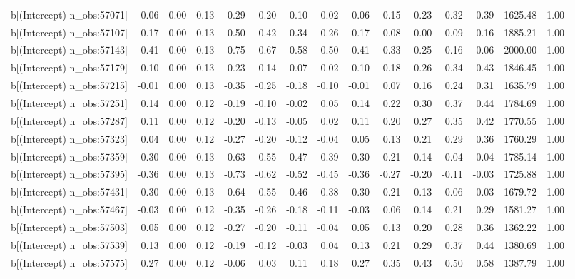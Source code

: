 \begin{table}[ht]
\begin{tabular}{rrrrrrrrrrrrrrr}
  b[(Intercept) n\_obs:57071] & 0.06 & 0.00 & 0.13 & -0.29 & -0.20 & -0.10 & -0.02 & 0.06 & 0.15 & 0.23 & 0.32 & 0.39 & 1625.48 & 1.00 \\ 
  b[(Intercept) n\_obs:57107] & -0.17 & 0.00 & 0.13 & -0.50 & -0.42 & -0.34 & -0.26 & -0.17 & -0.08 & -0.00 & 0.09 & 0.16 & 1885.21 & 1.00 \\ 
  b[(Intercept) n\_obs:57143] & -0.41 & 0.00 & 0.13 & -0.75 & -0.67 & -0.58 & -0.50 & -0.41 & -0.33 & -0.25 & -0.16 & -0.06 & 2000.00 & 1.00 \\ 
  b[(Intercept) n\_obs:57179] & 0.10 & 0.00 & 0.13 & -0.23 & -0.14 & -0.07 & 0.02 & 0.10 & 0.18 & 0.26 & 0.34 & 0.43 & 1846.45 & 1.00 \\ 
  b[(Intercept) n\_obs:57215] & -0.01 & 0.00 & 0.13 & -0.35 & -0.25 & -0.18 & -0.10 & -0.01 & 0.07 & 0.16 & 0.24 & 0.31 & 1635.79 & 1.00 \\ 
  b[(Intercept) n\_obs:57251] & 0.14 & 0.00 & 0.12 & -0.19 & -0.10 & -0.02 & 0.05 & 0.14 & 0.22 & 0.30 & 0.37 & 0.44 & 1784.69 & 1.00 \\ 
  b[(Intercept) n\_obs:57287] & 0.11 & 0.00 & 0.12 & -0.20 & -0.13 & -0.05 & 0.02 & 0.11 & 0.20 & 0.27 & 0.35 & 0.42 & 1770.55 & 1.00 \\ 
  b[(Intercept) n\_obs:57323] & 0.04 & 0.00 & 0.12 & -0.27 & -0.20 & -0.12 & -0.04 & 0.05 & 0.13 & 0.21 & 0.29 & 0.36 & 1760.29 & 1.00 \\ 
  b[(Intercept) n\_obs:57359] & -0.30 & 0.00 & 0.13 & -0.63 & -0.55 & -0.47 & -0.39 & -0.30 & -0.21 & -0.14 & -0.04 & 0.04 & 1785.14 & 1.00 \\ 
  b[(Intercept) n\_obs:57395] & -0.36 & 0.00 & 0.13 & -0.73 & -0.62 & -0.52 & -0.45 & -0.36 & -0.27 & -0.20 & -0.11 & -0.03 & 1725.88 & 1.00 \\ 
  b[(Intercept) n\_obs:57431] & -0.30 & 0.00 & 0.13 & -0.64 & -0.55 & -0.46 & -0.38 & -0.30 & -0.21 & -0.13 & -0.06 & 0.03 & 1679.72 & 1.00 \\ 
  b[(Intercept) n\_obs:57467] & -0.03 & 0.00 & 0.12 & -0.35 & -0.26 & -0.18 & -0.11 & -0.03 & 0.06 & 0.14 & 0.21 & 0.29 & 1581.27 & 1.00 \\ 
  b[(Intercept) n\_obs:57503] & 0.05 & 0.00 & 0.12 & -0.27 & -0.20 & -0.11 & -0.04 & 0.05 & 0.13 & 0.20 & 0.28 & 0.36 & 1362.22 & 1.00 \\ 
  b[(Intercept) n\_obs:57539] & 0.13 & 0.00 & 0.12 & -0.19 & -0.12 & -0.03 & 0.04 & 0.13 & 0.21 & 0.29 & 0.37 & 0.44 & 1380.69 & 1.00 \\ 
  b[(Intercept) n\_obs:57575] & 0.27 & 0.00 & 0.12 & -0.06 & 0.03 & 0.11 & 0.18 & 0.27 & 0.35 & 0.43 & 0.50 & 0.58 & 1387.79 & 1.00 \\ 

\end{tabular}
\end{table}
